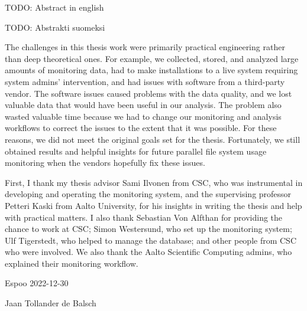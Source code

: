 \makecoverpage
\makecopyrightpage


\begin{abstractpage}[english]
TODO: Abstract in english
\end{abstractpage}



\begin{abstractpage}[finnish]
TODO: Abstrakti suomeksi
\end{abstractpage}


The challenges in this thesis work were primarily practical engineering rather than deep theoretical ones.
For example, we collected, stored, and analyzed large amounts of monitoring data, had to make installations to a live system requiring system admins' intervention, and had issues with software from a third-party vendor.
The software issues caused problems with the data quality, and we lost valuable data that would have been useful in our analysis.
The problem also wasted valuable time because we had to change our monitoring and analysis workflows to correct the issues to the extent that it was possible.
For these reasons, we did not meet the original goals set for the thesis.
Fortunately, we still obtained results and helpful insights for future parallel file system usage monitoring when the vendors hopefully fix these issues.

First, I thank my thesis advisor Sami Ilvonen from CSC, who was instrumental in developing and operating the monitoring system, and the supervising professor Petteri Kaski from Aalto University, for his insights in writing the thesis and help with practical matters.
I also thank Sebastian Von Alfthan for providing the chance to work at CSC; Simon Westersund, who set up the monitoring system; Ulf Tigerstedt, who helped to manage the database; and other people from CSC who were involved.
We also thank the Aalto Scientific Computing admins, who explained their monitoring workflow.

\vspace{5cm}
Espoo 2022-12-30

\vspace{5mm}
{\hfill Jaan Tollander de Balsch \hspace{1cm}}

\newpage

\setcounter{tocdepth}{2}
\thesistableofcontents
